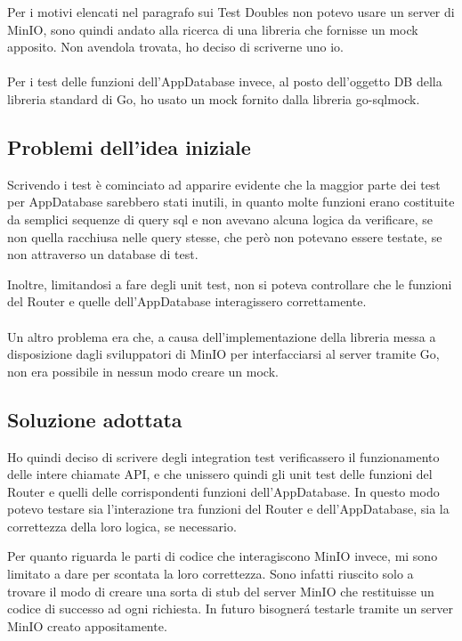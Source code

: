 \documentclass[italian, oneside]{sapthesis} %
\begin{document}
		Per i motivi elencati nel paragrafo sui Test Doubles non potevo usare un server di MinIO, sono quindi andato alla ricerca di una libreria che fornisse un mock apposito. Non avendola trovata, ho deciso di scriverne uno io.

		\paragraph*{}
		Per i test delle funzioni dell'AppDatabase invece, al posto dell'oggetto DB della libreria standard di Go, ho usato un mock fornito dalla libreria go-sqlmock.

		\subsection{Problemi dell'idea iniziale}
		Scrivendo i test \`e cominciato ad apparire evidente che la maggior parte dei test per AppDatabase sarebbero stati inutili, in quanto molte funzioni erano costituite da semplici sequenze di query sql e non avevano alcuna logica da verificare, se non quella racchiusa nelle query stesse, che per\`o non potevano essere testate, se non attraverso un database di test.

		Inoltre, limitandosi a fare degli unit test, non si poteva controllare che le funzioni del Router e quelle dell'AppDatabase interagissero correttamente.

		\paragraph*{}
		Un altro problema era che, a causa dell'implementazione della libreria messa a disposizione dagli sviluppatori di MinIO per interfacciarsi al server tramite Go, non era possibile in nessun modo creare un mock.

		\subsection{Soluzione adottata}
		Ho quindi deciso di scrivere degli integration test verificassero il funzionamento delle intere chiamate API, e che unissero quindi gli unit test delle funzioni del Router e quelli delle corrispondenti funzioni dell'AppDatabase. In questo modo potevo testare sia l'interazione tra funzioni del Router e dell'AppDatabase, sia la correttezza della loro logica, se necessario.

		Per quanto riguarda le parti di codice che interagiscono MinIO invece, mi sono limitato a dare per scontata la loro correttezza. Sono infatti riuscito solo a trovare il modo di creare una sorta di stub del server MinIO che restituisse un codice di successo ad ogni richiesta. In futuro bisogner\'a testarle tramite un server MinIO creato appositamente.
\end{document}
